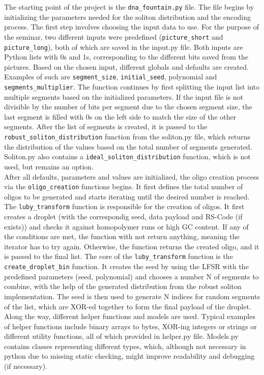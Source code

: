 \documentclass[12pt]%
{article}
\begin{document}
The starting point of the project is the \texttt{dna\_fountain.py} file. The file begins by initializing the parameters needed for the soliton distribution and the encoding process. The first step involves choosing the input data to use. For the purpose of the seminar, two different inputs were predefined (\texttt{picture\_short} and \texttt{picture\_long}), both of which are saved in the input.py file. Both inputs are Python lists with 0s and 1s, corresponding to the different bits saved from the pictures. Based on the chosen input, different globals and defaults are created. Examples of such are \texttt{segment\_size}, \texttt{initial\_seed}, polynomial and \texttt{segments\_multiplier}. The function continues by first splitting the input list into multiple segments based on the initialized parameters. If the input file is not divisible by the number of bits per segment due to the chosen segment size, the last segment is filled with 0s on the left side to match the size of the other segments. After the list of segments is created, it is passed to the \texttt{robust\_soliton\_distribution} function from the soliton.py file, which returns the distribution of the values based on the total number of segments generated. Soliton.py also contains a \texttt{ideal\_soliton\_distribution} function, which is not used, but remains an option. \\
After all defaults, parameters and values are initialized, the oligo creation process via the \texttt{oligo\_creation} functions begins. It first defines the total number of oligos to be generated and starts iterating until the desired number is reached. The \texttt{luby\_transform} function is responsible for the creation of oligos. It first creates a droplet (with the correspondig seed, data payload and RS-Code (if exists)) and checks it against homopolymer runs or high GC content. If any of the conditions are met, the function with not return anything, meaning the iterator has to try again. Otherwise, the function returns the created oligo, and it is passed to the final list. The core of the \texttt{luby\_transform} function is the \texttt{create\_droplet\_bin} function. It creates the seed by using the LFSR with the predefined parameters (seed, polynomial) and chooses a number N of segments to combine, with the help of the generated distribution from the robust soliton implementation.  The seed is then used to generate N indices for random segments of the list, which are XOR-ed together to form the final payload of the droplet. Along the way, different helper functions and models are used. Typical examples of helper functions include binary arrays to bytes, XOR-ing integers or strings or different utility functions, all of which provided in helper.py file. Models.py contains classes representing different types, which, although not necessary in python due to missing static checking, might improve readability and debugging (if necessary). \\
\end{document}
